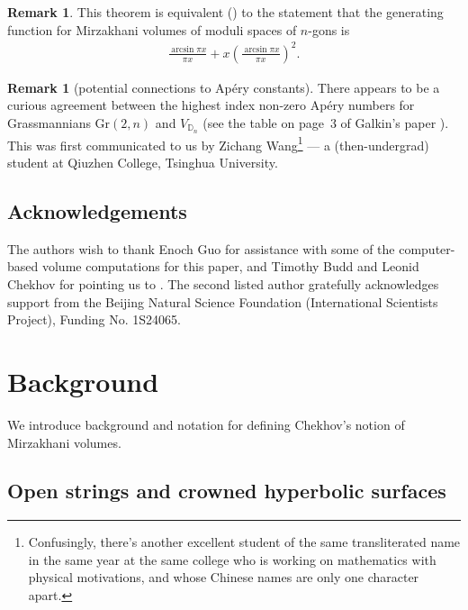 \documentclass{amsart}
\theoremstyle{definition}
\newtheorem{remark}[proposition]{Remark}
\begin{document}
\begin{remark}
This theorem is equivalent () to the statement that the generating function for Mirzakhani volumes of moduli spaces of $n$-gons is  
\begin{align*}
\frac{\arcsin{\pi x}}{\pi x}
+
x\left(\frac{\arcsin{\pi x}}{\pi x}\right)^2.
\end{align*}
\end{remark}


\begin{remark}[potential connections to Ap\'ery constants]
    There appears to be a curious agreement between the highest index non-zero Ap\'{e}ry numbers for Grassmannians $\mathrm{Gr}(2,n)$ and $V_{\mathbb{D}_n}$ (see the table on page~3 of Galkin's paper \cite{galkin_apery}). This was first communicated to us by Zichang Wang\footnote{Confusingly, there's another excellent student of the same transliterated name in the same year at the same college who is working on mathematics with physical motivations, and whose Chinese names are only one character apart.} --- a (then-undergrad) student at Qiuzhen College, Tsinghua University.
\end{remark}


\subsection*{Acknowledgements} The authors wish to thank Enoch Guo for assistance with some of the computer-based volume computations for this paper, and Timothy Budd and Leonid Chekhov for pointing us to \cite{MO402985}. The second listed author gratefully acknowledges support from the Beijing Natural Science Foundation (International Scientists Project), Funding No. 1S24065.











\section{Background}

We introduce background and notation for defining Chekhov's notion of Mirzakhani volumes.

\subsection{Open strings and crowned hyperbolic surfaces}
\end{document}
